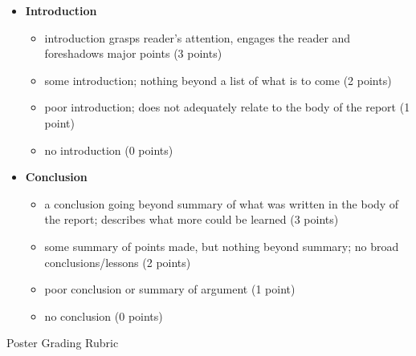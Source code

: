 \documentclass[11pt,letterpaper]{article}
\begin{document}
\begin{itemize}
\item \textbf{Introduction}
\begin{itemize}
\item[\underline{\hspace{.2in}}]  introduction grasps reader's attention, engages the reader and foreshadows major points (3 points)
\item[\underline{\hspace{.2in}}] some introduction; nothing beyond a list of what is to come (2 points)
\item[\underline{\hspace{.2in}}] poor introduction; does not adequately relate to the body of the report (1 point)
\item[\underline{\hspace{.2in}}] no introduction (0 points)
\end{itemize}
 
\item  \textbf{Conclusion} 
\begin{itemize}
\item[\underline{\hspace{.2in}}] a conclusion going beyond summary of what was written in the body of the report; describes what more could be learned (3 points)
\item[\underline{\hspace{.2in}}] some summary of points made, but nothing beyond summary; no broad conclusions/lessons (2 points)
\item[\underline{\hspace{.2in}}]  poor conclusion or summary of argument (1 point) 
\item[\underline{\hspace{.2in}}]  no conclusion (0 points) 
\end{itemize}
\end{itemize}


\indent Poster Grading Rubric
\end{document}
